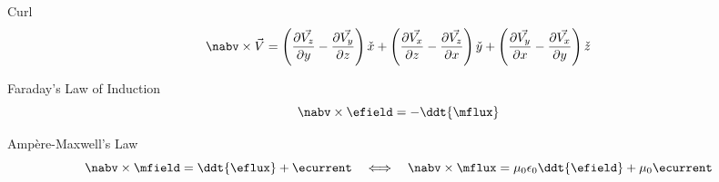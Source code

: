\begin{frame}{Curl}
    \begin{equation}
        \nabv \times \vec{V} = \left(\frac{\partial\vec{V_z}}{\partial y}-\frac{\partial\vec{V_y}}{\partial z} \right) \check{x} +
        \left(\frac{\partial\vec{V_x}}{\partial z}-\frac{\partial\vec{V_z}}{\partial x} \right) \check{y} +
        \left(\frac{\partial\vec{V_y}}{\partial x}-\frac{\partial\vec{V_x}}{\partial y} \right) \check{z}
    \end{equation}
    \vspace{-15pt}
\begin{twocolumns}[0.5]
    \leftcol
    \rightcol
 \end{twocolumns}
\end{frame}

\begin{frame}{Faraday's Law of Induction}
    \vspace{-10pt}
    \begin{equation}
        \nabv \times \efield = -\ddt{\mflux}
    \end{equation}
\end{frame}

\begin{frame}{Ampère-Maxwell's Law}
    \vspace{-10pt}
    \begin{equation}
        \nabv \times \mfield = \ddt{\eflux} + \ecurrent
        \hspace{1em} \Longleftrightarrow \hspace{1.0em}
        \nabv \times \mflux = \mu_0 \epsilon_0 \ddt{\efield} + \mu_0 \ecurrent
    \end{equation}
\end{frame}

